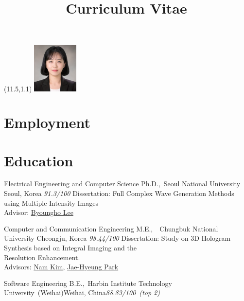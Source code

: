 \documentclass[10pt,a4paper]{moderncv}
\title{Curriculum Vitae}
\begin{document}
\hskip -3.5cm{\makecvtitle}

\begin{textblock}{0}(11.5,1.1)
	\includegraphics[width=2.3cm]{bio.jpg}
\end{textblock}

\small{}
\section{Employment}

\section{Education}
{Electrical Engineering and Computer Science}
{Ph.D.,~Seoul National University}
{Seoul, Korea}
{\textit{91.3/100}}
{Dissertation: Full Complex Wave Generation Methods using Multiple Intensity Images\\{Advisor: \href{http://oeqelab.snu.ac.kr/PROF}
{Byoungho Lee}}}

{Computer and Communication Engineering}
{M.E.,~~Chungbuk National University}
{Cheongju, Korea}
{\textit{98.44/100}}
{Dissertation: Study on 3D Hologram Synthesis based on Integral Imaging and the\\ Resolution Enhancement.\\{Advisors: \href{http://osp.chungbuk.ac.kr/lab/pro.html}{Nam Kim}, \href{https://sites.google.com/site/3dlabinha/People/advisor}{Jae-Hyeung Park}}}

{Software Engineering}
{B.E.,~Harbin Institute Technology University~(Weihai)}{Weihai, China}{\textit{88.83/100~(top 2)}}{}
\end{document}
